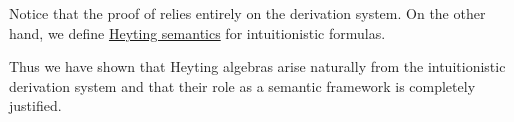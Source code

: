 \begin{remark}\label{rem:thm:intuitionistic_lindenbaum_tarski_algebra/syntactic_proof}
  Notice that the proof of  relies entirely on the derivation system. On the other hand, we define \hyperref[def:propositional_heyting_semantics]{Heyting semantics} for intuitionistic formulas.

  Thus we have shown that Heyting algebras arise naturally from the intuitionistic derivation system and that their role as a semantic framework is completely justified.
\end{remark}
